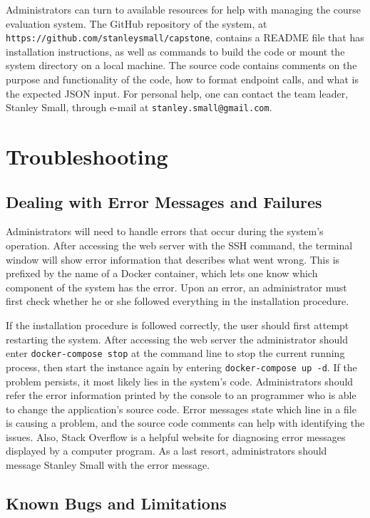 \documentclass{article}
\begin{document}
Administrators can turn to available resources for help with managing the course evaluation system. The GitHub repository of the system, at \verb|https://github.com/stanleysmall/capstone|, contains a README file that has installation instructions, as well as commands to build the code or mount the system directory on a local machine. The source code contains comments on the purpose and functionality of the code, how to format endpoint calls, and what is the expected JSON input. For personal help, one can contact the team leader, Stanley Small, through e-mail at \verb|stanley.small@gmail.com|.

\section{Troubleshooting}

\subsection{Dealing with Error Messages and Failures}

Administrators will need to handle errors that occur during the system's operation. After accessing the web server with the SSH command, the terminal window will show error information that describes what went wrong. This is prefixed by the name of a Docker container, which lets one know which component of the system has the error. Upon an error, an administrator must first check whether he or she followed everything in the installation procedure.

If the installation procedure is followed correctly, the user should first attempt restarting the system. After accessing the web server the administrator should enter \verb|docker-compose stop| at the command line to stop the current running process, then start the instance again by entering \verb|docker-compose up -d|.  If the problem persists, it most likely lies in the system's code. Administrators should refer the error information printed by the console to an programmer who is able to change the application's source code. Error messages state which line in a file is causing a problem, and the source code comments can help with identifying the issues. Also, Stack Overflow is a helpful website for diagnosing error messages displayed by a computer program. As a last resort, administrators should message Stanley Small with the error message.

\subsection{Known Bugs and Limitations}
\end{document}
